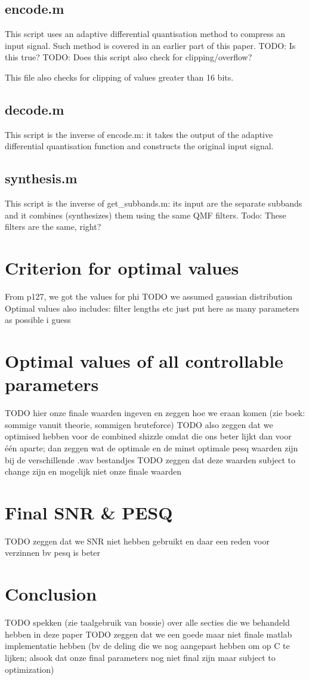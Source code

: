 \documentclass[a4paper]{article}
\begin{document}
\subsection{encode.m}
This script uses an adaptive differential quantisation method to compress an input signal. Such method is covered in an earlier part of this paper. TODO: Is this true?
TODO: Does this script also check for clipping/overflow?

This file also checks for clipping of values greater than 16 bits.

\subsection{decode.m}
This script is the inverse of encode.m: it takes the output of the adaptive differential quantisation function and constructs the original input signal.

\subsection{synthesis.m}
This script is the inverse of get\_subbands.m: its input are the separate subbands and it combines (synthesizes) them using the same QMF filters. Todo: These filters are the same, right?

\section{Criterion for optimal values}
From p127, we got the values for phi TODO we assumed gaussian distribution
Optimal values also includes: filter lengths etc just put here as many parameters as possible i guess

\section{Optimal values of all controllable parameters}
TODO hier onze finale waarden ingeven en zeggen hoe we eraan komen (zie boek: sommige vanuit theorie, sommigen bruteforce)
TODO also zeggen dat we optimised hebben voor de combined shizzle omdat die ons beter lijkt dan voor één aparte; dan zeggen wat de optimale en de minst optimale pesq waarden zijn bij de verschillende .wav bestandjes
TODO zeggen dat deze waarden subject to change zijn en mogelijk niet onze finale waarden

\section{Final SNR \& PESQ}
TODO zeggen dat we SNR niet hebben gebruikt en daar een reden voor verzinnen bv pesq is beter

\section{Conclusion}
TODO spekken (zie taalgebruik van bossie) over alle secties die we behandeld hebben in deze paper
TODO zeggen dat we een goede maar niet finale matlab implementatie hebben (bv de deling die we nog aangepast hebben om op C te lijken; alsook dat onze final parameters nog niet final zijn maar subject to optimization)
\end{document}
